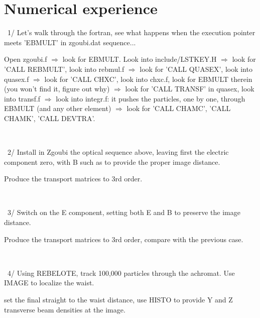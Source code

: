 \documentclass[10pt]{article}
\newcommand{\nin}{\noindent~}
\begin{document}
\section*{ Numerical experience }

\nin 1/ Let's  walk through the fortran, see what happens when the execution pointer meets 'EBMULT' in zgoubi.dat sequence...

Open zgoubi.f $\Rightarrow$ look for EBMULT. Look into include/LSTKEY.H  $\Rightarrow$  look for 'CALL REBMULT', look into rebmul.f
$\Rightarrow$  look for 'CALL QUASEX', look into quasex.f $\Rightarrow$ look for 'CALL CHXC', look into chxc.f, look for
EBMULT therein (you won't find it, figure out why)
$\Rightarrow$ look for 'CALL TRANSF' in quasex, look into transf.f $\Rightarrow$ look into integr.f: it pushes the particles, one by one,
through EBMULT (and any other element) $\Rightarrow$  look for 'CALL CHAMC', 'CALL CHAMK', 'CALL DEVTRA'.

~

\nin 2/ Install in Zgoubi the optical sequence above, leaving first the electric component zero, with B
such as to provide the proper image distance.

Produce the transport matrices to 3rd order. 

~

\nin 3/ Switch on the E component, setting both E and B to preserve the image distance.

Produce the transport matrices to 3rd order, compare with the previous case.

~

\nin 4/ Using REBELOTE, track 100,000 particles through the achromat. Use IMAGE to localize the waist.

set the final straight to the waist distance,  use HISTO to provide Y and Z transverse beam densities at the image.
\end{document}
